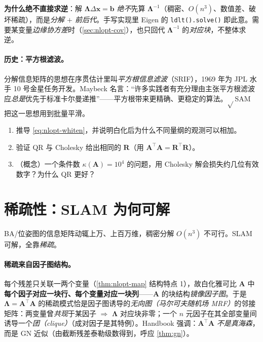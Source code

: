 \begin{note}
\textbf{为什么绝不直接求逆}：解 $\boldsymbol{\Lambda}\Delta\mathbf{x}=\mathbf{b}$ \emph{绝不}先算 $\boldsymbol{\Lambda}^{-1}$（稠密、$O(n^3)$、数值差、破坏稀疏），而是\emph{分解 $+$ 前后代}。手写实现里 Eigen 的 \texttt{ldlt().\allowbreak solve()} 即此意。需要某变量\emph{边缘协方差}时（\cref{sec:nlopt-cov}），也只回代 $\boldsymbol{\Lambda}^{-1}$ 的\emph{对应块}，不整体求逆。
\end{note}

\paragraph{历史：平方根滤波。}\cite{dellaert2017factor,carlone2026handbook}
分解信息矩阵的思想在序贯估计里叫\emph{平方根信息滤波}（SRIF），1969 年为 JPL 水手 10 号金星任务开发。Maybeck 名言：“许多实践者有充分理由主张平方根滤波应\emph{总是}优先于标准卡尔曼递推”——平方根带来更精确、更稳定的算法。$\sqrt{}$SAM\cite{dellaert2017factor} 把这一思想用到批量平滑。

\begin{practice}
\begin{enumerate}
  \item 推导 \cref{eq:nlopt-whiten}，并说明白化后为什么不同量纲的观测可以相加。
  \item 验证 QR 与 Cholesky 给出相同的 $\mathbf{R}$（用 $\mathbf{A}^\top\mathbf{A}=\mathbf{R}^\top\mathbf{R}$）。
  \item （概念）一个条件数 $\kappa(\mathbf{A})=10^4$ 的问题，用 Cholesky 解会损失约几位有效数字？为什么 QR 更好？
\end{enumerate}
\end{practice}

\section{稀疏性：SLAM 为何可解}
\label{sec:nlopt-sparse}

BA/位姿图的信息矩阵动辄上万、上百万维，稠密分解 $O(n^3)$ 不可行。SLAM 可解，全靠\emph{稀疏}\cite{carlone2026handbook,gaoxiang2019slam14,dellaert2017factor}。

\paragraph{稀疏来自因子图结构。}\cite{dellaert2017factor,carlone2026handbook}
每个残差只关联一两个变量（\cref{thm:nlopt-map} 结构特点 1），故白化雅可比 $\mathbf{A}$ 中\textbf{每个因子对应一块行、每个变量对应一块列}——$\mathbf{A}$ 的块结构\emph{镜像因子图}。于是 $\boldsymbol{\Lambda}=\mathbf{A}^\top\mathbf{A}$ 的稀疏模式恰是因子图诱导的\emph{无向图（马尔可夫随机场 MRF）}的邻接矩阵：两变量曾\emph{共现}于某因子 $\Rightarrow$ $\boldsymbol{\Lambda}$ 对应块非零；一个 $n$ 元因子在其全部变量间诱导一个\emph{团（clique）}（成对因子是其特例）。Handbook\cite{carlone2026handbook} 强调：$\mathbf{A}^\top\mathbf{A}$ \emph{不是真海森}，而是 GN 近似（由截断残差泰勒级数得到，呼应 \cref{thm:gn}）。

